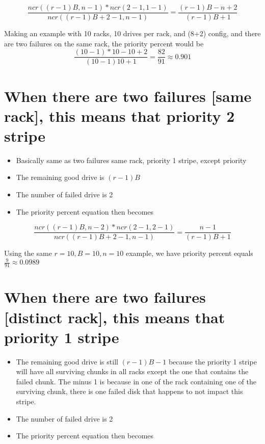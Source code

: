 \documentclass[journal]{IEEEtran}
\begin{document}
\begin{equation*}
  \frac{ncr((r-1)B, n-1)*ncr(2-1, 1-1)}{ncr((r-1)B+2-1, n-1)}=\frac{(r-1)B-n+2}{(r-1)B+1}
\end{equation*}

Making an example with 10 racks, 10 drives per rack, and (8+2) config, and there are two failures on the same rack, the priority percent would be
\begin{equation*}
  \frac{(10-1)*10-10+2}{(10-1)10+1}=\frac{82}{91}\approx 0.901
\end{equation*}

\section{When there are two failures [same rack], this means that \textbf{priority 2 stripe} }
\begin{itemize}
  \item Basically same as two failures same rack, priority 1 stripe, except priority
  \item The remaining good drive is $(r-1)B$
  \item The number of failed drive is 2
  \item The priority percent equation then becomes
\end{itemize}

\begin{equation*}
  \frac{ncr((r-1)B, n-2)*ncr(2-1, 2-1)}{ncr((r-1)B+2-1, n-1)}=\frac{n-1}{(r-1)B+1}
\end{equation*}

Using the same $r=10, B=10, n=10$ example, we have priority percent equals $\frac{9}{91}\approx 0.0989$


\section{When there are two failures [distinct rack], this means that \textbf{priority 1 stripe}}
\begin{itemize}
  \item The remaining good drive is still $(r-1)B-1$ because the priority 1 stripe will have all surviving chunks in all racks except the one that contains the failed chunk. The minus 1 is because in one of the rack containing one of the surviving chunk, there is one failed disk that happens to not impact this stripe.
  \item The number of failed drive is 2
  \item The priority percent equation then becomes
\end{itemize}
\end{document}
